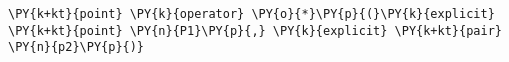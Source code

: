 \begin{Verbatim}[commandchars=\\\{\}]
    \PY{k+kt}{point} \PY{k}{operator} \PY{o}{*}\PY{p}{(}\PY{k}{explicit} \PY{k+kt}{point} \PY{n}{P1}\PY{p}{,} \PY{k}{explicit} \PY{k+kt}{pair} \PY{n}{p2}\PY{p}{)}
\end{Verbatim}
